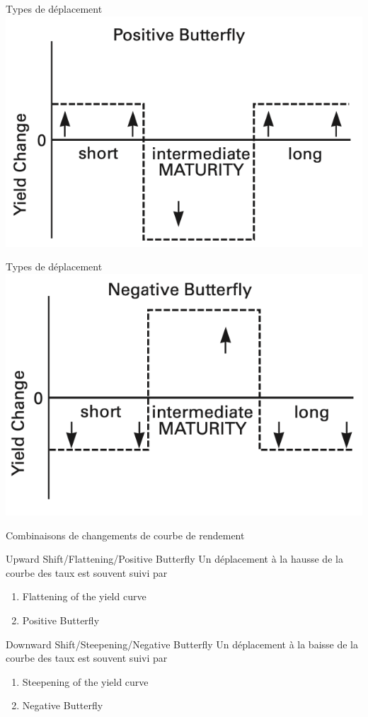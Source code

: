 \documentclass[10pt,a4paper]{beamer}
\begin{document}
\begin{frame}{Types de déplacement}
\includegraphics{5}
\end{frame}

\begin{frame}{Types de déplacement}
\includegraphics{6}
\end{frame}

\begin{frame}{Combinaisons de changements de courbe de rendement}
\begin{block}{Upward Shift/Flattening/Positive Butterfly}
Un déplacement à la hausse de la courbe des taux est souvent suivi par 
\begin{enumerate}[label=\arabic*)]
\item Flattening of the yield curve 
\item Positive Butterfly
\end{enumerate}
\end{block}
\begin{block}{Downward Shift/Steepening/Negative Butterfly}
Un déplacement à la baisse de la courbe des taux est souvent suivi par 
\begin{enumerate}[label=\arabic*)]
\item Steepening of the yield curve 
\item Negative Butterfly
\end{enumerate}
\end{block}
\end{frame}
\end{document}

